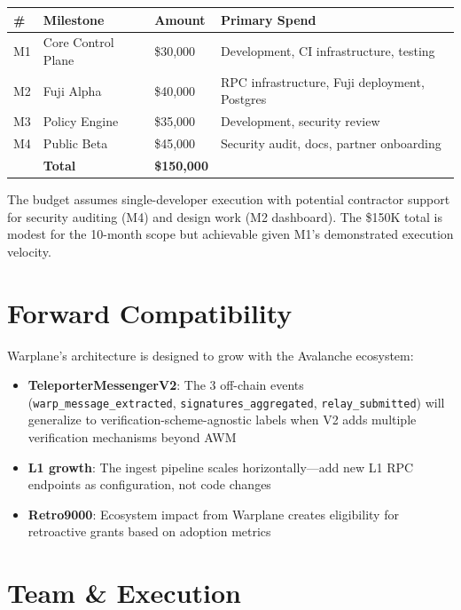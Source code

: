\documentclass[11pt,a4paper]{article}
\begin{document}
\begin{table}[h]
\centering
\begin{tabularx}{\textwidth}{@{}C{1cm} L{5cm} C{2cm} L{5cm}@{}}
\toprule
\textbf{\#} & \textbf{Milestone} & \textbf{Amount} & \textbf{Primary Spend} \\
\midrule
M1 & Core Control Plane & \$30,000 & Development, CI infrastructure, testing \\
M2 & Fuji Alpha & \$40,000 & RPC infrastructure, Fuji deployment, Postgres \\
M3 & Policy Engine & \$35,000 & Development, security review \\
M4 & Public Beta & \$45,000 & Security audit, docs, partner onboarding \\
\midrule
& \textbf{Total} & \textbf{\$150,000} & \\
\bottomrule
\end{tabularx}
\end{table}

The budget assumes single-developer execution with potential contractor support for security auditing (M4) and design work (M2 dashboard). The \$150K total is modest for the 10-month scope but achievable given M1's demonstrated execution velocity.

\section{Forward Compatibility}

Warplane's architecture is designed to grow with the Avalanche ecosystem:

\begin{itemize}
  \item \textbf{TeleporterMessengerV2}: The 3 off-chain events (\texttt{warp\_message\_extracted}, \texttt{signatures\_aggregated}, \texttt{relay\_submitted}) will generalize to verification-scheme-agnostic labels when V2 adds multiple verification mechanisms beyond AWM
  \item \textbf{L1 growth}: The ingest pipeline scales horizontally---add new L1 RPC endpoints as configuration, not code changes
  \item \textbf{Retro9000}: Ecosystem impact from Warplane creates eligibility for retroactive grants based on adoption metrics
\end{itemize}

\section{Team \& Execution}
\end{document}
